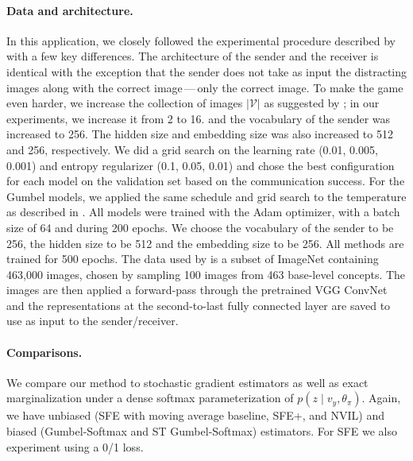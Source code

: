 \paragraph*{Data and architecture.} In this application, we closely
followed the experimental procedure described
by~\citet{Lazaridou2017} with a few key differences. The architecture
of the sender and the receiver is identical with the exception that
the sender does not take as input the distracting images along with
the correct image\,---\,only the correct image. To make the game even
harder, we increase the collection of images $|\mathcal{V}|$ as
suggested by \citet{Havrylov2017}; in our experiments, we increase it
from 2 to 16. and the vocabulary of the sender was increased to 256.
The hidden size and embedding size was also increased to 512 and 256,
respectively. We did a grid search on the learning rate (0.01, 0.005,
0.001) and entropy regularizer (0.1, 0.05, 0.01) and chose the best
configuration for each model on the validation set based on the
communication success. For the Gumbel models, we applied the same
schedule and grid search to the temperature as described in
. All models were trained with the Adam optimizer,
with a batch size of 64 and during 200 epochs. We choose the
vocabulary of the sender to be 256, the hidden size to be 512 and the
embedding size to be 256. All methods are trained for 500 epochs. The
data used by \citet{Lazaridou2017} is a subset of ImageNet containing
463,000 images, chosen by sampling 100 images from 463 base-level
concepts. The images are then applied a forward-pass through the
pretrained VGG ConvNet~\citep{convnet} and the representations at the
second-to-last fully connected layer are saved to use as input to the
sender/receiver.

\paragraph*{Comparisons.} We compare our method to stochastic gradient
estimators as well as exact marginalization under a dense softmax
parameterization of $p (z \mid v_y, \theta_\pi)$. Again, we have
unbiased (SFE with moving average baseline, SFE+, and NVIL) and
biased (Gumbel-Softmax and ST Gumbel-Softmax) estimators. For SFE we
also experiment using a 0/1 loss.


